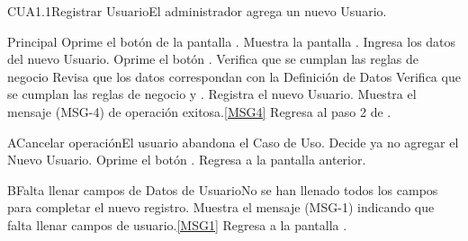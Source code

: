 	
	\begin{UseCase}{CUA1.1}{Registrar Usuario}{El administrador agrega un nuevo Usuario.}
	\end{UseCase}

	\begin{UCtrayectoria}{Principal}
			\UCpaso[\UCactor] Oprime el botón  de la pantalla .
			\UCpaso Muestra la pantalla .
			\UCpaso [\UCactor] Ingresa los datos del nuevo Usuario. 
			\UCpaso [\UCactor] Oprime el botón .
			\UCpaso Verifica que se cumplan las reglas de negocio  
			\UCpaso Revisa que los datos correspondan con la Definición de Datos 
			\UCpaso Verifica que se cumplan las reglas de negocio  y .  
			\UCpaso Registra el nuevo Usuario.
			\UCpaso Muestra el mensaje (MSG-4) de operación exitosa.\ref{MSG4}
			\UCpaso Regresa al paso 2 de .
	\end{UCtrayectoria}

	\begin{UCtrayectoriaA}{A}{Cancelar operación}{El usuario abandona el Caso de Uso.}
			\UCpaso[\UCactor] Decide ya no agregar el Nuevo Usuario.
			\UCpaso[\UCactor] Oprime el botón .
			\UCpaso Regresa a la pantalla anterior.
	\end{UCtrayectoriaA}

	\begin{UCtrayectoriaA}{B}{Falta llenar campos de Datos de Usuario}{No se han llenado todos los campos para completar el nuevo registro.}
			\UCpaso Muestra el mensaje (MSG-1) indicando que falta llenar campos de usuario.\ref{MSG1} 
			\UCpaso Regresa a la pantalla .
	\end{UCtrayectoriaA}

